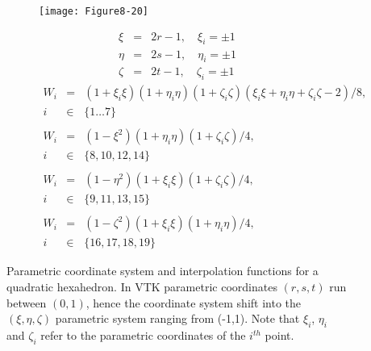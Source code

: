 \begin{figure}[!htb]
	\centering
	\begin{subfigure}{0.48\linewidth}
		\centering
		\texttt{[image: Figure8-20]}
		\caption*{}
	\end{subfigure}
	\hfill
	\begin{subfigure}{0.48\linewidth}
		\begin{equation*}
		\begin{array}{lll}
		\xi &=& 2r  - 1,\quad \xi_i = \pm1 \\
		\eta &=& 2 s - 1,\quad \eta_i = \pm1 \\
		\zeta &=& 2 t - 1,\quad \zeta_i = \pm1
		\end{array}
		\end{equation*}
		\begin{equation*}
		\begin{array}{lll}
		W_i &=& (1 + \xi_i \xi)(1 + \eta_i \eta)(1 + \zeta_i \zeta)(\xi_i \xi + \eta_i \eta + \zeta_i \zeta - 2)/8, \\
		i &\in& \lbrace 1 \ldots 7 \rbrace \\ \\
		W_i &=& (1 - \xi^2)(1 + \eta_i \eta)(1 + \zeta_i \zeta)/4, \\
		i &\in& \lbrace 8, 10, 12, 14 \rbrace \\ \\
		W_i &=& (1 - \eta^2)(1 + \xi_i \xi)(1 + \zeta_i \zeta)/4, \\
		i &\in& \lbrace 9, 11, 13, 15 \rbrace \\ \\
		W_i &=& (1 - \zeta^2)(1 + \xi_i \xi)(1 + \eta_i \eta)/4, \\
		i &\in& \lbrace 16, 17, 18, 19 \rbrace	
		\end{array}
		\end{equation*}		
	\end{subfigure}%
	\caption{Parametric coordinate system and interpolation functions for a quadratic hexahedron. In VTK parametric coordinates $(r,s,t)$ run between $(0,1)$, hence the coordinate system shift into the $(\xi, \eta, \zeta)$ parametric system ranging from (-1,1). Note that $\xi_i$, $\eta_i$ and $\zeta_i$ refer to the parametric coordinates of the $i^{th}$ point.}
	\label{fig:Figure8-20}
\end{figure}

